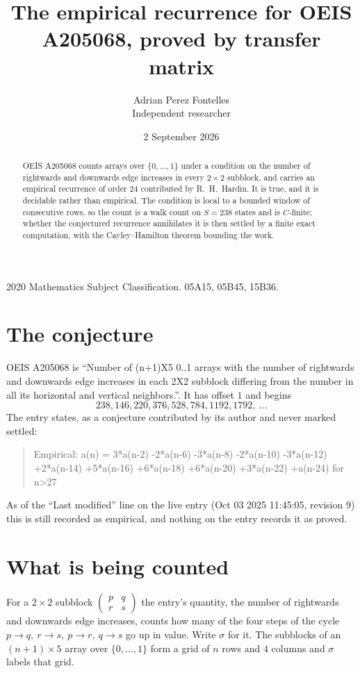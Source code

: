 \documentclass[11pt,a4paper]{article}
\title{The empirical recurrence for OEIS A205068, proved by transfer matrix}
\author{Adrian Perez Fontelles\\ \small Independent researcher}
\date{2 September 2026}
\theoremstyle{plain}
\theoremstyle{definition}
\begin{document}
\maketitle

\begin{abstract}
OEIS A205068 counts arrays over $\{0,\dots,1\}$ under a condition on the number of rightwards and downwards edge increases
in every $2\times2$ subblock, and carries an empirical recurrence of order $24$ contributed by
R.~H.~Hardin. It is true, and it is decidable rather than empirical. The condition is local to
a bounded window of consecutive rows, so the count is a walk count on $S=238$ states and is
$C$-finite; whether the conjectured recurrence annihilates it is then settled by a finite exact
computation, with the Cayley--Hamilton theorem bounding the work.
\end{abstract}

\noindent\small 2020 Mathematics Subject Classification. 05A15, 05B45, 15B36.\normalsize

\section{The conjecture}

OEIS A205068 is ``Number of (n+1)X5 0..1 arrays with the number of rightwards and downwards edge increases in each 2X2 subblock differing from the number in all its horizontal and vertical neighbors.''. It has offset $1$ and begins
\[
238, 146, 220, 376, 528, 784, 1192, 1792,\ \dots
\]
The entry states, as a conjecture contributed by its author and never marked settled:
\begin{quote}
Empirical: a(n) = 3*a(n-2) -2*a(n-6) -3*a(n-8) -2*a(n-10) -3*a(n-12) +2*a(n-14) +5*a(n-16) +6*a(n-18) +6*a(n-20) +3*a(n-22) +a(n-24) for n>27
\end{quote}
As of the ``Last modified'' line on the live entry (Oct 03 2025 11:45:05, revision 9) this is still
recorded as empirical, and nothing on the entry records it as proved.

\section{What is being counted}

For a $2\times2$ subblock $\begin{pmatrix}p&q\\r&s\end{pmatrix}$ the
entry's quantity, the number of rightwards and downwards edge increases, counts how many of the four steps of the cycle $p\to q,\ r\to s,\ p\to r,\ q\to s$ go up in value. Write $\sigma$ for it. The subblocks of an
$(n+1)\times5$ array over $\{0,\dots,1\}$ form a grid of $n$ rows and $4$
columns and $\sigma$ labels that grid.
\end{document}
